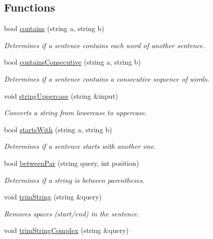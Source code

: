 \subsection*{Functions}
\begin{DoxyCompactItemize}
\item 
bool \hyperlink{namespaceutils_aaaff51c00798a6c05a15f4ecd0f02e9e}{contains} (string a, string b)
\begin{DoxyCompactList}\small\item\em Determines if a sentence contains each word of another sentence. \end{DoxyCompactList}\item 
bool \hyperlink{namespaceutils_af9af9e01b679f955003203f29ddf130b}{contains\+Consecutive} (string a, string b)
\begin{DoxyCompactList}\small\item\em Determines if a sentence contains a consecutive sequence of words. \end{DoxyCompactList}\item 
void \hyperlink{namespaceutils_a4cc31521e740c9e31b4bfa8ee85eff46}{string\+Uppercase} (string \&input)
\begin{DoxyCompactList}\small\item\em Converts a string from lowercase to uppercase. \end{DoxyCompactList}\item 
bool \hyperlink{namespaceutils_ae840ea1b4ad4ce23c2b48158ac75d557}{starts\+With} (string a, string b)
\begin{DoxyCompactList}\small\item\em Determines if a sentence starts with another one. \end{DoxyCompactList}\item 
bool \hyperlink{namespaceutils_a1e1de2e5772bffdfe2c8d3309a61ddab}{between\+Par} (string query, int position)
\begin{DoxyCompactList}\small\item\em Determines if a string is between parentheses. \end{DoxyCompactList}\item 
void \hyperlink{namespaceutils_a9f184d101ac739ab058355ab5413ca9a}{trim\+String} (string \&query)
\begin{DoxyCompactList}\small\item\em Removes spaces (start/end) in the sentence. \end{DoxyCompactList}\item 
void \hyperlink{namespaceutils_a0362c7510f0bb0c4449031f897626696}{trim\+String\+Complex} (string \&query)

\end{DoxyCompactItemize}
